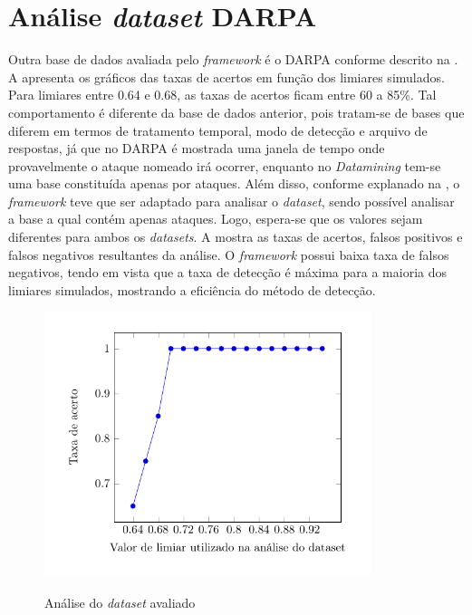 \section{Análise \textit{dataset} DARPA}
Outra base de dados avaliada pelo \textit{framework} é o DARPA conforme descrito na .
A  apresenta os gráficos das taxas de acertos em função dos limiares simulados. Para limiares entre 0.64 e 0.68, as taxas de acertos ficam entre 60 a 85\%. Tal comportamento é diferente da base de dados anterior, pois tratam-se de bases que diferem em termos de tratamento temporal, modo de detecção e arquivo de respostas, já que no DARPA é mostrada uma janela de tempo onde provavelmente o ataque nomeado irá ocorrer, enquanto no \textit{Datamining} tem-se uma base constituída apenas por ataques. Além disso, conforme explanado na , o \textit{framework} teve que ser adaptado para analisar o \textit{dataset}, sendo possível analisar a base a qual contém apenas ataques. Logo, espera-se que os valores sejam diferentes para ambos os \textit{datasets}. A  mostra as taxas de acertos, falsos positivos e falsos negativos resultantes da análise. O \textit{framework} possui baixa taxa de falsos negativos, tendo em vista que a taxa de detecção é máxima para a maioria dos limiares simulados, mostrando a eficiência do método de detecção.       
 \begin{figure}[htb]
 	\centering
 	\caption{Análise do \textit{dataset} avaliado }
 	\includegraphics[width=0.85\textwidth]{figs/resultsDarpa.pdf}\\
 	\hspace{1.5cm}{Fonte: Elaborada pelo autor.}
 	\label{fig:ResultsDarpa}
 \end{figure}
 
